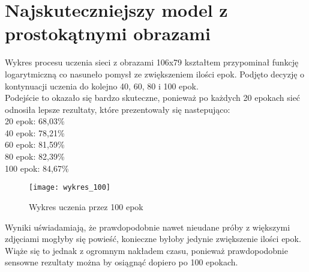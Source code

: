 \section{Najskuteczniejszy model z prostokątnymi obrazami}
Wykres procesu uczenia sieci z obrazami 106x79 kształtem przypominał funkcję logarytmiczną
co nasuneło pomysł ze zwiększeniem ilości epok. Podjęto decyzję o kontynuacji uczenia
do kolejno 40, 60, 80 i 100 epok.\\
Podejście to okazało się bardzo skuteczne, ponieważ po każdych 20 epokach
sieć odnosiła lepsze rezultaty, które prezentowały się nastepująco:\\
20 epok: 68,03\%\\
40 epok: 78,21\%\\
60 epok: 81,59\%\\
80 epok: 82,39\%\\
100 epok: 84,67\%\\
\begin{sidewaysfigure}
\texttt{[image: wykres\_100]}
\caption{Wykres uczenia przez 100 epok}
\end{sidewaysfigure}
Wyniki uświadamiają, że prawdopodobnie nawet nieudane próby z większymi zdjęciami
mogłyby się powieść, konieczne byłoby jedynie zwiększenie ilości epok. Wiąże się to jednak
z ogromnym nakładem czasu, ponieważ prawdopodobnie sensowne rezultaty można by osiągnąć
dopiero po 100 epokach.
